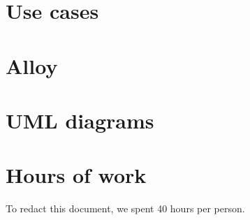 \begin{appendices}
\chapter{Use cases}


\chapter{Alloy}


\chapter{UML diagrams}


\chapter{Hours of work}
To redact this document, we spent 40 hours per person.

\end{appendices}

